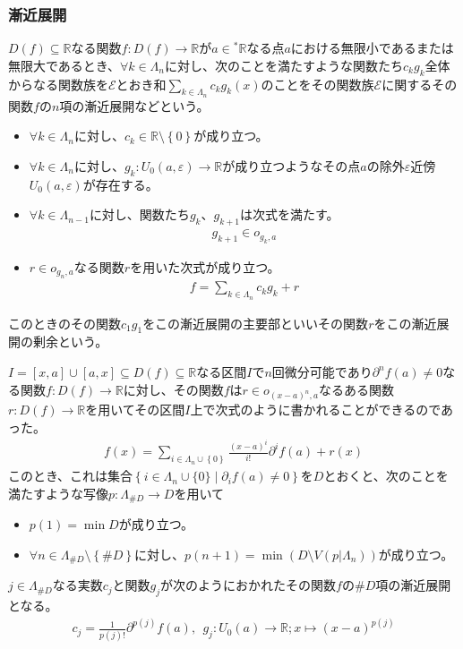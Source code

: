\documentclass[dvipdfmx]{jsarticle}
\begin{document}
\subsubsection{漸近展開}%
\begin{dfn}
$D(f) \subseteq \mathbb{R}$なる関数$f:D(f) \rightarrow \mathbb{R}$が$a \in{}^{*}\mathbb{R}なる点a$における無限小であるまたは無限大であるとき、$\forall k \in \varLambda_{n}$に対し、次のことを満たすような関数たち$c_{k}g_{k}$全体からなる関数族を$\mathcal{E}$とおき和$\sum_{k \in \varLambda_{n}} {c_{k}g_{k}(x)}$のことをその関数族$\mathcal{E}$に関するその関数$f$の$n$項の漸近展開などという。
\begin{itemize}
\item
  $\forall k \in \varLambda_{n}$に対し、$c_{k} \in \mathbb{R} \setminus \left\{ 0 \right\}$が成り立つ。
\item
  $\forall k \in \varLambda_{n}$に対し、$g_{k}:U_{0}(a,\varepsilon) \rightarrow \mathbb{R}$が成り立つようなその点$a$の除外$\varepsilon$近傍$U_{0}(a,\varepsilon)$が存在する。
\item
  $\forall k \in \varLambda_{n - 1}$に対し、関数たち$g_{k}$、$g_{k + 1}$は次式を満たす。
\begin{align*}
g_{k + 1} \in o_{g_{k},a}
\end{align*}
\item
  $r \in o_{g_{n},a}$なる関数$r$を用いた次式が成り立つ。
\begin{align*}
f = \sum_{k \in \varLambda_{n}} {c_{k}g_{k}} + r
\end{align*}
\end{itemize}
このときのその関数$c_{1}g_{1}$をこの漸近展開の主要部といいその関数$r$をこの漸近展開の剰余という。
\end{dfn}
\begin{thm}\label{4.2.4.5}
$I = [ x,a] \cup [ a,x] \subseteq D(f) \subseteq \mathbb{R}$なる区間$I$で$n$回微分可能であり$\partial^{n}f(a) \neq 0$なる関数$f:D(f) \rightarrow \mathbb{R}$に対し、その関数$f$は$r \in o_{(x - a)^{n},a}$なるある関数$r:D(f) \rightarrow \mathbb{R}$を用いてその区間$I$上で次式のように書かれることができるのであった。
\begin{align*}
f(x) = \sum_{i \in \varLambda_{n} \cup \left\{ 0 \right\}} {\frac{(x - a)^{i}}{i!}\partial^{i}f(a)} + r(x)
\end{align*}
このとき、これは集合$\left\{ i\in \varLambda_{n} \cup \{0\} \middle| \partial_{i} f(a)\neq 0\right\} $を$D$とおくと、次のことを満たすような写像$p:\varLambda_{\# D}\rightarrow D$を用いて
\begin{itemize}
\item
  $p(1) = \min D$が成り立つ。
\item
  $\forall n \in \varLambda_{\#D} \setminus \left\{ \#D \right\}$に対し、$p(n + 1) = \min\left( D \setminus V\left( p|\varLambda_{n} \right) \right)$が成り立つ。
\end{itemize}
$j \in \varLambda_{\#D}$なる実数$c_{j}$と関数$g_{j}$が次のようにおかれたその関数$fの\#D$項の漸近展開となる。
\begin{align*}
c_{j} = \frac{1}{p(j)!}\partial^{p(j)}f(a),\ \ g_{j}:U_{0}(a) \rightarrow \mathbb{R};x \mapsto (x - a)^{p(j)}
\end{align*}
\end{thm}
\end{document}
